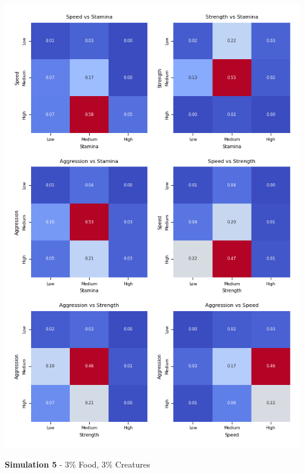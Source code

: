 \documentclass{article}
\begin{document}
\begin{center}
    \includegraphics[scale=0.9]{tests/4_confusion_matrices.png}
\end{center}
\textbf{Simulation 5} - 3\% Food, 3\% Creatures
\end{document}
